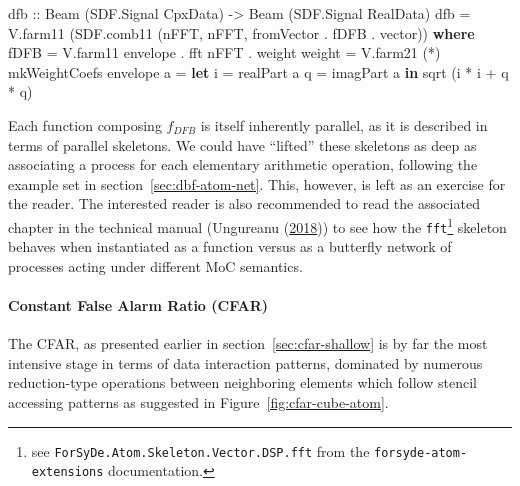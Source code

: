 \documentclass[
  a4paper,
]{article}
\newenvironment{Shaded}{}{}
\newcommand{\DataTypeTok}[1]{\textcolor[rgb]{0.56,0.13,0.00}{#1}}
\newcommand{\FunctionTok}[1]{\textcolor[rgb]{0.02,0.16,0.49}{#1}}
\newcommand{\KeywordTok}[1]{\textcolor[rgb]{0.00,0.44,0.13}{\textbf{#1}}}
\newcommand{\NormalTok}[1]{#1}
\newcommand{\OtherTok}[1]{\textcolor[rgb]{0.00,0.44,0.13}{#1}}
\let\oldparagraph\paragraph
\renewcommand{\paragraph}[1]{\oldparagraph{#1}\mbox{}}
\begin{document}
\begin{Shaded}
\begin{Highlighting}[numbers=left,,firstnumber=325,]
\OtherTok{dfb ::} \DataTypeTok{Beam}\NormalTok{ (}\DataTypeTok{SDF.Signal} \DataTypeTok{CpxData}\NormalTok{)}
    \OtherTok{->} \DataTypeTok{Beam}\NormalTok{ (}\DataTypeTok{SDF.Signal} \DataTypeTok{RealData}\NormalTok{)}
\NormalTok{dfb }\FunctionTok{=}\NormalTok{ V.farm11}
\NormalTok{      (SDF.comb11 (nFFT, nFFT,}
\NormalTok{                   fromVector }\FunctionTok{.}\NormalTok{ fDFB }\FunctionTok{.}\NormalTok{ vector))}
  \KeywordTok{where}
\NormalTok{    fDFB       }\FunctionTok{=}\NormalTok{ V.farm11 envelope }\FunctionTok{.}\NormalTok{ fft nFFT }\FunctionTok{.}\NormalTok{ weight }
\NormalTok{    weight     }\FunctionTok{=}\NormalTok{ V.farm21 (}\FunctionTok{*}\NormalTok{) mkWeightCoefs}
\NormalTok{    envelope a }\FunctionTok{=} \KeywordTok{let}\NormalTok{ i }\FunctionTok{=}\NormalTok{ realPart a}
\NormalTok{                     q }\FunctionTok{=}\NormalTok{ imagPart a}
                 \KeywordTok{in} \FunctionTok{sqrt}\NormalTok{ (i }\FunctionTok{*}\NormalTok{ i }\FunctionTok{+}\NormalTok{ q }\FunctionTok{*}\NormalTok{ q)}
\end{Highlighting}
\end{Shaded}

Each function composing \(f_{DFB}\) is itself inherently parallel, as it
is described in terms of parallel skeletons. We could have ``lifted''
these skeletons as deep as associating a process for each elementary
arithmetic operation, following the example set in
section~\ref{sec:dbf-atom-net}. This, however, is left as an exercise
for the reader. The interested reader is also recommended to read the
associated chapter in the technical manual (Ungureanu
(\protect\hyperlink{ref-atom-manual}{2018})) to see how the
\texttt{fft\textquotesingle{}}\footnote{see
  \texttt{ForSyDe.Atom.Skeleton.Vector.DSP.fft\textquotesingle{}} from
  the \texttt{forsyde-atom-extensions} documentation.} skeleton behaves
when instantiated as a function versus as a butterfly network of
processes acting under different MoC semantics.

\hypertarget{constant-false-alarm-ratio-cfar}{%
\paragraph{Constant False Alarm Ratio
(CFAR)}\label{constant-false-alarm-ratio-cfar}}

The CFAR, as presented earlier in section~\ref{sec:cfar-shallow} is by
far the most intensive stage in terms of data interaction patterns,
dominated by numerous reduction-type operations between neighboring
elements which follow stencil accessing patterns as suggested in
Figure~\ref{fig:cfar-cube-atom}.
\end{document}
